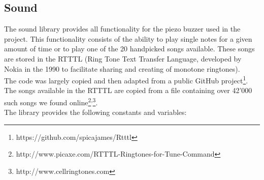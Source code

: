 \documentclass{report}
\begin{document}
\subsection{Sound}\label{sound}
The sound library provides all functionality for the piezo buzzer used in the project. This functionality consists of the ability to play single notes for a given amount of time or to play one of the 20 handpicked songs available. These songs are stored in the RTTTL (Ring Tone Text Transfer Language, developed by Nokia in the 1990 to facilitate sharing and creating of monotone ringtones). \\
The code was largely copied and then adapted from a public GitHub project\footnote{https://github.com/spicajames/Rtttl}.
The songs available in the RTTTL are copied from a file containing over 42'000 such songs we found online\footnote{http://www.picaxe.com/RTTTL-Ringtones-for-Tune-Command}\textsuperscript{,}\footnote{http://www.cellringtones.com}. \\
The library provides the following constants and variables:
\end{document}
